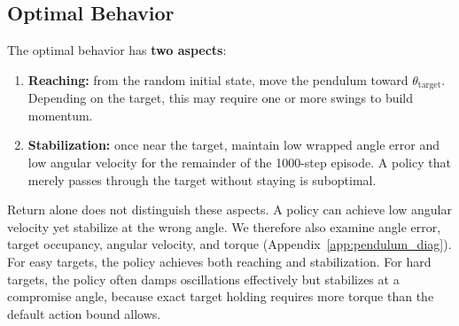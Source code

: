 \documentclass[11pt,a4paper]{article}
\begin{document}
\begin{table}[H]
\centering
\caption{Final auto-$\alpha$ SAC results across target angles.}
\label{tab:pendulum_auto_final}
\end{table}

\subsection{Optimal Behavior}

The optimal behavior has \textbf{two aspects}:
\begin{enumerate}
    \item \textbf{Reaching:} from the random initial state, move the pendulum toward $\theta_{\text{target}}$. Depending on the target, this may require one or more swings to build momentum.
    \item \textbf{Stabilization:} once near the target, maintain low wrapped angle error and low angular velocity for the remainder of the 1000-step episode. A policy that merely passes through the target without staying is suboptimal.
\end{enumerate}

Return alone does not distinguish these aspects. A policy can achieve low angular velocity yet stabilize at the wrong angle. We therefore also examine angle error, target occupancy, angular velocity, and torque (Appendix~\ref{app:pendulum_diag}). For easy targets, the policy achieves both reaching and stabilization. For hard targets, the policy often damps oscillations effectively but stabilizes at a compromise angle, because exact target holding requires more torque than the default action bound allows.
\end{document}
